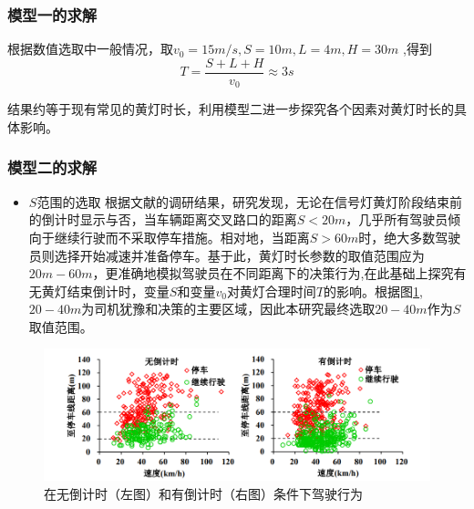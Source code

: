 \documentclass[withoutpreface,bwprint]{cumcmthesis}
\begin{document}
\subsubsection{模型一的求解}
根据数值选取中一般情况，取$v_0 = 15m/s, S = 10m, L=4m, H=30m$ ,得到$$T = \frac{S + L + H}{v_0} \approx 3s$$	

结果约等于现有常见的黄灯时长，利用模型二进一步探究各个因素对黄灯时长的具体影响。
\subsubsection{模型二的求解}
\begin{itemize}
	\item $S$范围的选取
	根据文献\cite{ref2}的调研结果，研究发现，无论在信号灯黄灯阶段结束前的倒计时显示与否，当车辆距离交叉路口的距离$S<20m$，几乎所有驾驶员倾向于继续行驶而不采取停车措施。相对地，当距离$S>60m$时，绝大多数驾驶员则选择开始减速并准备停车。基于此，黄灯时长参数的取值范围应为$20m -60m$，更准确地模拟驾驶员在不同距离下的决策行为,在此基础上探究有无黄灯结束倒计时，变量$S$和变量$v_0$对黄灯合理时间$T$的影响。根据图\ref{fig:downt1},$20-40m$为司机犹豫和决策的主要区域，因此本研究最终选取$20-40m$作为$S$取值范围。
\end{itemize}
\begin{figure}[htbp!]
	\centering
	\includegraphics[width=\textwidth]{pics/chooses}
	\caption{在无倒计时（左图）和有倒计时（右图）条件下驾驶行为\cite{ref1}}
	\label{fig:downt1}
\end{figure}
\end{document}
